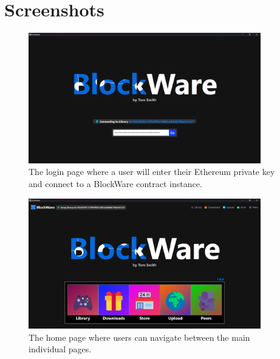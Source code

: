 \chapter{Screenshots}\label{app:screenshots}

\begin{figure}[H]
  \centering
  \includegraphics[width=0.9\textwidth]{assets/images/screenshots/login.png}
  \caption{The login page where a user will enter their Ethereum private key and connect to a BlockWare contract instance.}
\end{figure}

\begin{figure}[H]
  \centering
  \includegraphics[width=0.9\textwidth]{assets/images/screenshots/home.png}
  \caption{The home page where users can navigate between the main individual pages.}
\end{figure}

